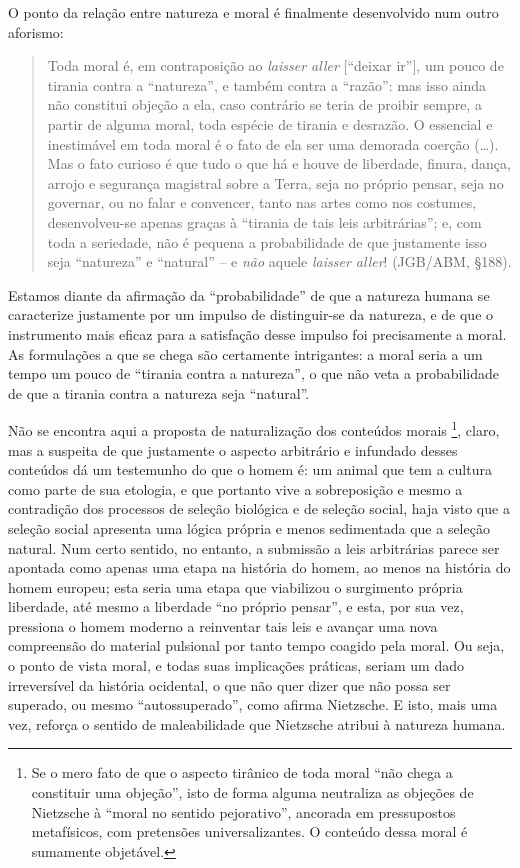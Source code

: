 \documentclass[
	12pt,				%
	openright,			%
	oneside,			%
	a4paper,			%
	english,			%
	french,				%
	spanish,			%
	brazil				%
	]{abntex2}
\begin{document}
O ponto da relação entre natureza e moral é finalmente desenvolvido num outro aforismo:

\begin{quotation}
Toda moral é, em contraposição ao \textit{laisser aller} [“deixar ir”], um pouco de tirania contra a “natureza”, e também contra a “razão”: mas isso ainda não constitui objeção a ela, caso contrário se teria de proibir sempre, a partir de alguma moral, toda espécie de tirania e desrazão. O essencial e inestimável em toda moral é o fato de ela ser uma demorada coerção (…). Mas o fato curioso é que tudo o que há e houve de liberdade, finura, dança, arrojo e segurança magistral sobre a Terra, seja no próprio pensar, seja no governar, ou no falar e convencer, tanto nas artes como nos costumes, desenvolveu-se apenas graças à “tirania de tais leis arbitrárias”; e, com toda a seriedade, não é pequena a probabilidade de que justamente isso seja “natureza” e “natural” – e \textit{não} aquele \textit{laisser aller}! (JGB/ABM, §188).
\end{quotation}

Estamos diante da afirmação da “probabilidade” de que a natureza humana se caracterize justamente por um impulso de distinguir-se da natureza, e de que o instrumento mais eficaz para a satisfação desse impulso foi precisamente a moral. As formulações a que se chega são certamente intrigantes: a moral seria a um tempo um pouco de “tirania contra a natureza”, o que não veta a probabilidade de que a tirania contra a natureza seja “natural”.

	Não se encontra aqui a proposta de naturalização dos conteúdos morais
\footnote{Se o mero fato de que o aspecto tirânico de toda moral “não chega a constituir uma objeção”, isto de forma alguma neutraliza as objeções de Nietzsche à “moral no sentido pejorativo”, ancorada em pressupostos metafísicos, com pretensões universalizantes. O conteúdo dessa moral é sumamente objetável.}, 
claro, mas a suspeita de que justamente o aspecto arbitrário e infundado desses conteúdos dá um testemunho do que o homem é: um animal que tem a cultura como parte de sua etologia, e que portanto vive a sobreposição e mesmo a contradição dos processos de seleção biológica e de seleção social, haja visto que a seleção social apresenta uma lógica própria e menos sedimentada que a seleção natural. Num certo sentido, no entanto, a submissão a leis arbitrárias parece ser apontada como apenas uma etapa na história do homem, ao menos na história do homem europeu; esta seria uma etapa que viabilizou o surgimento própria liberdade, até mesmo a liberdade “no próprio pensar”, e esta, por sua vez, pressiona o homem moderno a reinventar tais leis e avançar uma nova compreensão do material pulsional por tanto tempo coagido pela moral. Ou seja, o ponto de vista moral, e todas suas implicações práticas, seriam um dado irreversível da história ocidental, o que não quer dizer que não possa ser superado, ou mesmo “autossuperado”, como afirma Nietzsche. E isto, mais uma vez, reforça o sentido de maleabilidade que Nietzsche atribui à natureza humana.
	
\end{document}
